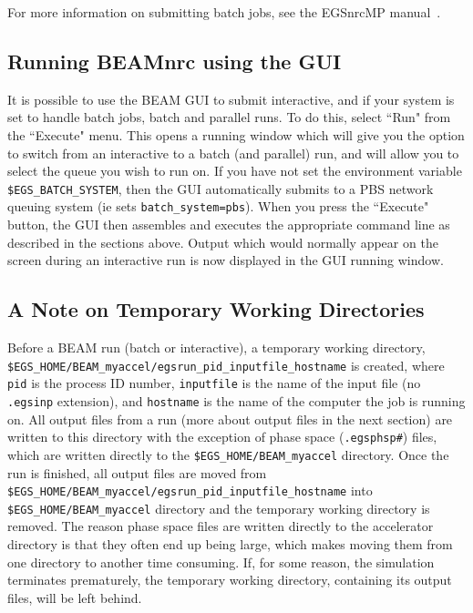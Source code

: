 \documentclass[12pt,twoside]{article}
\begin{document}
For more information on submitting batch jobs, see the EGSnrcMP manual~\cite{Ka03}.

\subsection{Running BEAMnrc using the GUI}

It is possible to use the BEAM GUI to submit interactive, and if your
system is set to handle batch jobs, batch and parallel runs.  To do this,
select ``Run" from the ``Execute" menu.  This opens a running window which
will give you the option to switch from an interactive to a batch (and
parallel) run, and will allow you to select the queue you wish to run on.
If you have not set the environment variable {\tt \$EGS\_BATCH\_SYSTEM},
then the GUI automatically submits to a PBS network queuing system (ie
sets {\tt batch\_system=pbs}).  When you press the ``Execute" button, the
GUI then assembles and executes the appropriate command line as described
in the sections above.  Output which would normally appear on the screen
during an interactive run is now displayed in the GUI running window.

\subsection{A Note on Temporary Working Directories}
\label{twdsect}

Before a BEAM run (batch or interactive), a temporary working directory,\\
{\tt \$EGS\_HOME/BEAM\_myaccel/egsrun\_pid\_inputfile\_hostname} is
created, where {\tt pid} is the process ID number, {\tt inputfile} is
the name of the input file (no {\tt .egsinp} extension), and {\tt hostname}
is the name of the computer the job is running on.  All output
files from a run (more about output files in the next section)
are written to this directory with the exception of
phase space ({\tt .egsphsp\#}) files, which are written directly to
the {\tt \$EGS\_HOME/BEAM\_myaccel} directory.  Once the run is finished,
all output files are moved from \\
{\tt \$EGS\_HOME/BEAM\_myaccel/egsrun\_pid\_inputfile\_hostname} into {\tt \$EGS\_HOME/BEAM\_myaccel} directory and the temporary
working directory is removed.  The reason phase space files are written
directly to the accelerator directory is that they often end up
being large, which makes moving them from one directory to another time
consuming.  If, for some reason, the simulation terminates prematurely, the temporary working directory, containing its output files, will be left behind.
\end{document}
